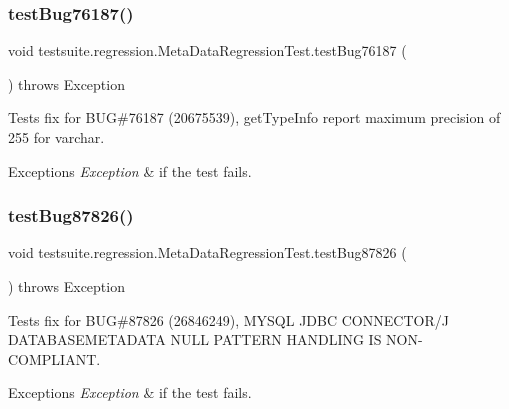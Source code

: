 \subsubsection{\texorpdfstring{test\+Bug76187()}{testBug76187()}}
{\footnotesize\ttfamily void testsuite.\+regression.\+Meta\+Data\+Regression\+Test.\+test\+Bug76187 (\begin{DoxyParamCaption}{ }\end{DoxyParamCaption}) throws Exception}

Tests fix for B\+UG\#76187 (20675539), get\+Type\+Info report maximum precision of 255 for varchar.


\begin{DoxyExceptions}{Exceptions}
{\em Exception} & if the test fails. \\
\hline
\end{DoxyExceptions}
\mbox{\label{classtestsuite_1_1regression_1_1_meta_data_regression_test_a0182fb63c3dfdf76644200cbca0614db}} 
\subsubsection{\texorpdfstring{test\+Bug87826()}{testBug87826()}}
{\footnotesize\ttfamily void testsuite.\+regression.\+Meta\+Data\+Regression\+Test.\+test\+Bug87826 (\begin{DoxyParamCaption}{ }\end{DoxyParamCaption}) throws Exception}

Tests fix for B\+UG\#87826 (26846249), M\+Y\+S\+QL J\+D\+BC C\+O\+N\+N\+E\+C\+T\+O\+R/J D\+A\+T\+A\+B\+A\+S\+E\+M\+E\+T\+A\+D\+A\+TA N\+U\+LL P\+A\+T\+T\+E\+RN H\+A\+N\+D\+L\+I\+NG IS N\+O\+N-\/\+C\+O\+M\+P\+L\+I\+A\+NT.


\begin{DoxyExceptions}{Exceptions}
{\em Exception} & if the test fails. \\
\hline
\end{DoxyExceptions}
\mbox{\label{classtestsuite_1_1regression_1_1_meta_data_regression_test_ac05ecaf65c43b94713d2dc0ab3430a94}} 
